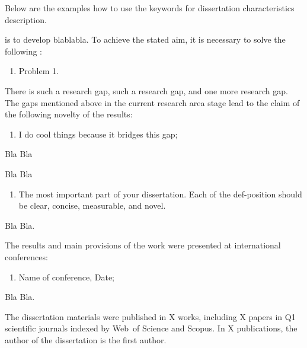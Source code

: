 Below are the examples how to use the keywords for dissertation characteristics description. 

{\aim} is to develop blablabla. To achieve the stated aim, it is necessary to solve the following {\tasks}:
\begin{enumerate}[beginpenalty=10000] %
\item Problem 1. 
\end{enumerate}

{\novelty}
There is such a research gap, such a research gap, and one more research gap.  
The gaps mentioned above in the current research area stage lead to the claim of the following novelty of the results:
\begin{enumerate}[beginpenalty=10000] %
	\item I do cool things because it bridges this gap; 
\end{enumerate}

{\influence}
Bla Bla

{\methods}
Bla Bla

{}
\begin{enumerate}[beginpenalty=10000] %
  \item The most important part of your dissertation. Each of the def-position should be clear, concise, measurable, and novel.  
\end{enumerate}

{\reliability} Bla Bla. 

{\probation}
The  results  and  main  provisions  of  the  work  were  presented  at  international 
conferences:
\begin{enumerate}
	\item Name of conference, Date;
\end{enumerate}

{\contribution} Bla Bla.

{\publications} The dissertation materials were published in X works, including X papers in Q1 scientific journals indexed by Web~of Science and Scopus. In X publications, the author of the dissertation is the first author.